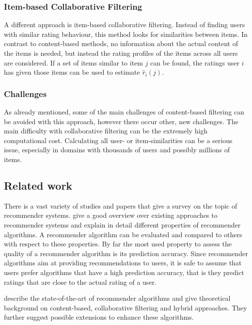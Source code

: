 \subsubsection{Item-based Collaborative Filtering}
\label{ssst:itembasedcf} A different approach is item-based collaborative filtering. Instead of finding users with similar rating behaviour, this method looks for similarities between items. In contrast to content-based methods, no information about the actual content of the items is needed, but instead the rating profiles of the items across all users are considered. If a set of items similar to item $j$ can be found, the ratings user $i$ has given those items can be used to estimate $\hat{r}_i(j)$.

\subsubsection{Challenges}
\label{ssst:challengescf} As already mentioned, some of the main challenges of content-based filtering can be avoided with this approach, however there occur other, new challenges. The main difficulty with collaborative filtering can be the extremely high computational cost. Calculating all user- or item-similarities can be a serious issue, especially in domains with thousands of users and possibly millions of items.

\subsection{Related work}
\label{sst:rsrelatedwork} There is a vast variety of studies and papers that give a survey on the topic of recommender systems. \cite{Ricci_2011} give a good overview over existing approaches to recommender systems and explain in detail different properties of recommender algorithms. A recommender algorithm can be evaluated and compared to others with respect to these properties. By far the most used property to assess the quality of a recommender algorithm is its prediction accuracy. Since recommender algorithms aim at providing recommendations to users, it is safe to assume that users prefer algorithms that have a high prediction accuracy, that is they predict ratings that are close to the actual rating of a user.

\cite{Adomavicius_2005} describe the state-of-the-art of recommender algorithms and give theoretical background on content-based, collaborative filtering and hybrid approaches. They further suggest possible extensions to enhance these algorithms.

